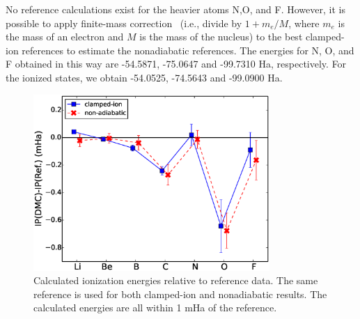 No reference calculations exist for the heavier atoms N,O, and F. However, it is possible to apply finite-mass correction~\cite{Davidson_Atoms,Cencek_LiH} (i.e., divide by $1+m_e/M$, where $m_e$ is the mass of an electron and $M$ is the mass of the nucleus) to the best clamped-ion references to estimate the nonadiabatic references. The energies for N, O, and F obtained in this way are -54.5871, -75.0647 and -99.7310 Ha, respectively. For the ionized states, we obtain -54.0525, -74.5643 and -99.0900 Ha. %

\begin{figure}[h]
\centering
\includegraphics[width=0.8\textwidth]{ionization}
\caption{Calculated ionization energies relative to reference data. The same reference is used for both clamped-ion and nonadiabatic results. The calculated energies are all within 1 mHa of the reference. \label{fig:ionization}}
\end{figure}


